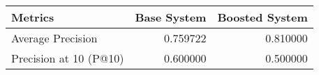\begin{tabular}{lrr}
\toprule
Metrics & Base System & Boosted System \\
\midrule
Average Precision & 0.759722 & 0.810000 \\
Precision at 10 (P@10) & 0.600000 & 0.500000 \\
\bottomrule
\end{tabular}
